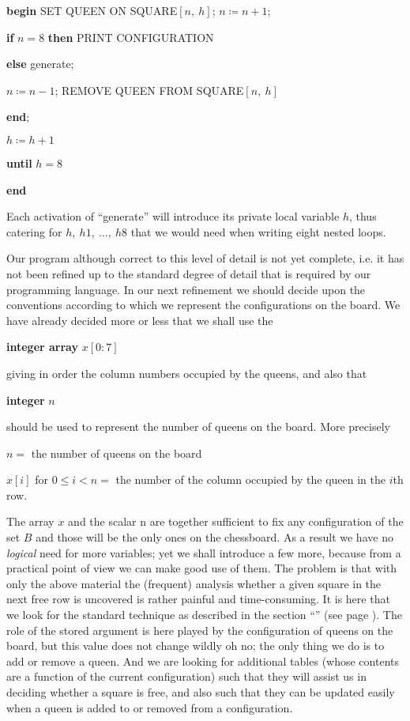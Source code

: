 \quad \textbf{\textbf{begin}} SET QUEEN ON SQUARE$[n,\ h]$; $n \coloneq n + 1$;

\quad \quad \textbf{if} $n = 8$ \textbf{then} PRINT CONFIGURATION

\quad \quad \textbf{else} generate;

\quad \quad $n \coloneq n - 1$; REMOVE QUEEN FROM SQUARE$[n,\ h]$

\quad \textbf{end};

\quad $h \coloneq h + 1$

\quad \textbf{until} $h = 8$

\textbf{end}

Each activation of ``generate'' will introduce its private local variable $h$, thus catering for $h,\ h1,\ \dots,\ h8$ that we would need when writing eight nested loops.

Our program \textemdash{}  although correct to this level of detail \textemdash{}  is not yet complete, i.e. it has not been refined up to the standard degree of detail that is required by our programming language. In our next refinement we should decide upon the conventions according to which we represent the configurations on the board. We have already decided more or less that we shall use the

\quad \textbf{integer array} $x[0:7]$

\noindent
giving in order the column numbers occupied by the queens, and also that

\quad \textbf{integer} $n$

\noindent
should be used to represent the number of queens on the board. More precisely

$n =$ the number of queens on the board

\parindent $x[i]$ for $0 \leqslant i < n =$ the number of the column occupied by the queen in the $i$th row.

The array $x$ and the scalar n are together sufficient to fix any configuration of the set $B$ and those will be the only ones on the chessboard. As a result we have no \textit{logical} need for more variables; yet we shall introduce a few more, because from a practical point of view we can make good use of them. The problem is that with only the above material the (frequent) analysis whether a given square in the next free row is uncovered is rather painful and time-consuming. It is here that we look for the standard technique as described in the section ``'' (see page \pageref{sec:trading-storage-for-computation-speed}). The role of the stored argument is here played by the configuration of queens on the board, but this value does not change wildly \textemdash{} oh no; the only thing we do is to add or remove a queen. And we are looking for additional tables (whose contents are a function of the current configuration) such that they will assist us in deciding whether a square is free, and also such that they can be updated easily when a queen is added to or removed from a configuration.

